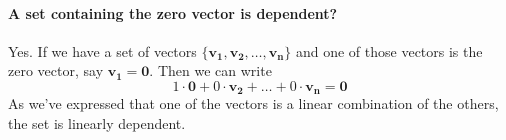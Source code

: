 \documentclass{article}
\begin{document}
            \paragraph{A set containing the zero vector is dependent?}
                Yes. If we have a set of vectors $\{\mathbf{v_1}, \mathbf{v_2}, \ldots, \mathbf{v_n}\}$
                and one of those vectors is the zero vector, say $\mathbf{v_1} = \mathbf{0}$.
                Then we can write
                \[
                1\cdot\mathbf{0} + 0\cdot\mathbf{v_2} + \ldots + 0\cdot\mathbf{v_n} = \mathbf{0}
                \]
                As we've expressed that one of the vectors is a linear combination
                of the others, the set is linearly dependent.
\end{document}
